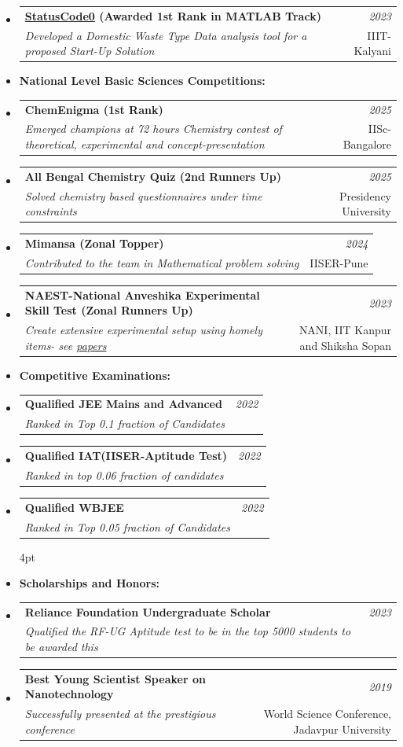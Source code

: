 \documentclass[a4paper,10pt]{article}
\makeatletter
\newcommand{\resumeSubheading}[4]{
    \item\small{
        \begin{tabular*}{0.97\textwidth}[t]{l@{\extracolsep{\fill}}r}
            \textbf{#1} & \textit{#2} \\
            \textit{#3} & \small{#4}
        \end{tabular*}
    }\vspace{3pt}
}
\makeatother
\begin{document}
{\begin{itemize}[leftmargin=*,label={},itemsep=4pt]
        \resumeSubheading{\href{https://statuscode0.devfolio.co/}{StatusCode0} (Awarded 1st Rank in MATLAB Track)}{2023}
    {Developed a Domestic Waste Type Data analysis tool for a proposed Start-Up Solution}{IIIT-Kalyani}
 
 \vspace{4pt}
    \large \item \textbf{National Level Basic Sciences Competitions:}
        \resumeSubheading{ChemEnigma (1st Rank)}{2025}
    {Emerged champions at 72 hours Chemistry contest of theoretical, experimental and concept-presentation}{IISc-Bangalore}
    \resumeSubheading{All Bengal Chemistry Quiz (2nd Runners Up)}{2025}
    {Solved chemistry based questionnaires under time constraints}{Presidency University}
    \resumeSubheading{Mimansa (Zonal Topper)}{2024}
    {Contributed to the team in Mathematical problem solving}{IISER-Pune}
   \resumeSubheading{NAEST-National Anveshika Experimental Skill Test (Zonal Runners Up)}{2023}
    {Create extensive experimental setup using homely items- see \href{https://github.com/Shuvam-Banerji-Seal/NAEST_Sample_Experiments}{papers}}{NANI, IIT Kanpur and Shiksha Sopan}  


    \item \textbf{Competitive Examinations:}
    \resumeSubheading{Qualified JEE Mains and Advanced}{2022}
    {Ranked in Top 0.1 fraction of Candidates}{}\vspace{-4pt}
    \resumeSubheading{Qualified IAT(IISER-Aptitude Test)}{2022}
    {Ranked in top 0.06 fraction of candidates}{}\vspace{-4pt}
    \resumeSubheading{Qualified WBJEE}{2022}
    {Ranked in Top 0.05 fraction of Candidates}

    

    \vspace{4pt}\item \textbf{Scholarships and Honors:}
    \resumeSubheading{Reliance Foundation Undergraduate Scholar}{2023}
    {Qualified the RF-UG Aptitude test to be in the top 5000 students to be awarded this} {}\vspace{-2pt}
    \resumeSubheading{Best Young Scientist Speaker on Nanotechnology}{2019}
    {Successfully presented at the prestigious conference }{World Science Conference, Jadavpur University}
    
\end{itemize}
}
\end{document}
